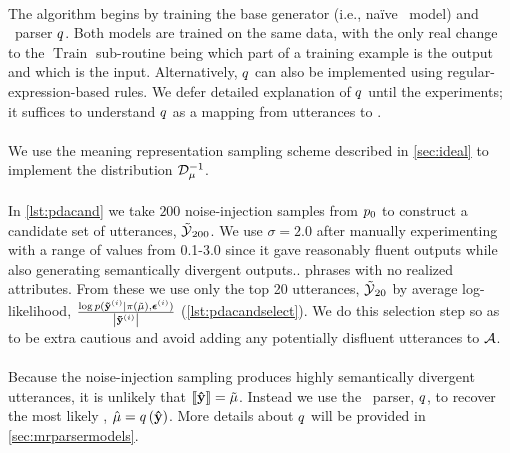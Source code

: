 \paragraph{} The algorithm begins by training the
base generator (i.e., na{\"i}ve \sequencetosequence~model) and
\meaningrepresentation~parser $q$.  Both models are trained on the same
data, with the only real change to the $\operatorname{Train}$ sub-routine being
which part of a training example is the output and which is the input.
Alternatively, $q$ can also be implemented using regular-expression-based
rules. We defer detailed explanation of $q$ until the experiments; it
suffices to understand $q$ as a mapping from utterances to
\meaningrepresentations.

\paragraph{}
We use the meaning representation sampling scheme described in
\autoref{sec:ideal} to implement the distribution $\mathcal{D}_{\mu}^{-1}$. 

\paragraph{} In \autoref{lst:pdacand} we take $200$
noise-injection samples from $p_0$ to construct a candidate set of
utterances, $\mathcal{\tilde{\mathcal{Y}}}_{200}$.  We use $\sigma=2.0$ after manually
experimenting with a range of values from 0.1-3.0 since it gave reasonably
fluent outputs while also generating semantically divergent outputs..  phrases
with no realized attributes.  From these we use only the top 20 utterances,
$\mathcal{\tilde{\mathcal{Y}}}_{20}$ by average log-likelihood,
$\frac{\log p(\boldsymbol{\tilde{\mathbf{y}}}^{(i)}|\pi(\tilde{\mu}),
\boldsymbol{\epsilon}^{(i)})}{{\left\vert \boldsymbol{\tilde{\mathbf{y}}}^{(i)} \right\vert}}$
(\autoref{lst:pdacandselect}).  We do this selection step so as to be extra
cautious and avoid adding any potentially disfluent utterances to ${\mathcal{A}}$.
    
\paragraph{} Because the noise-injection sampling produces highly
semantically divergent utterances, it is unlikely that $\left\llbracket \boldsymbol{\hat{\mathbf{y}}}  \right\rrbracket
= \tilde{\mu}$. Instead we use the \meaningrepresentation~parser, $q$, to
recover the most likely \meaningrepresentation, $\hat{\mu} =
q\left(\boldsymbol{\hat{\mathbf{y}}}\right)$.  More details about $q$ will be
provided in \autoref{sec:mrparsermodels}.

